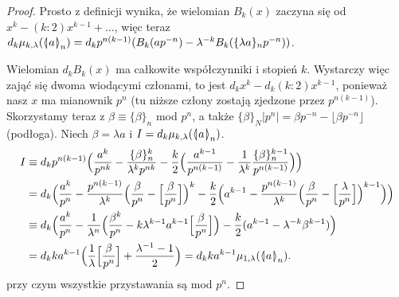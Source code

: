 \begin{proof}
	Prosto z definicji wynika, że wielomian $B_k(x)$ zaczyna się od $x^k - (k:2) x^{k-1} + \ldots$, więc teraz $d_k \mu_{k, \lambda} (\mathrel{\langle\mkern-3.85mu\mid\mkern-4mu} {a}\mathrel{\mkern-4mu\mid\mkern-3.85mu\rangle}_{n}) =  d_k p^{n(k-1)} (B_k(ap^{-n}) - \lambda^{-k} B_k(\{\lambda a\}_n p^{-n}))$.
	
	Wielomian $d_kB_k(x)$ ma całkowite współczynniki i stopień $k$.
	Wystarczy więc zająć się dwoma wiodącymi członami, to jest $d_k x^k - d_k (k:2) x^{k-1}$, ponieważ nasz $x$ ma mianownik $p^n$ (tu niższe człony zostają zjedzone przez $p^{n(k-1)}$).
	Skorzystamy teraz z $\beta \equiv \{\beta\}_n$ mod $p^n$, a także $\{\beta\}_N |p^n| = \beta p^{-n} - \lfloor \beta p^{-n} \rfloor$ (podłoga).
	Niech $\beta = \lambda a$ i $I = d_k\mu_{k,\lambda}(\mathrel{\langle\mkern-3.85mu\mid\mkern-4mu} {a}\mathrel{\mkern-4mu\mid\mkern-3.85mu\rangle}_{n})$. %
	\begin{align*}
	I & \equiv d_k p^{n(k-1)} \Bigl(\frac{a^k}{p^{nk}} - \frac{\{\beta\}_n^k}{\lambda^kp^{nk}} - \frac k 2 \Bigl(\frac{a^{k-1}}{p^{n(k-1)}} - \frac{1}{\lambda^k} \frac{\{\beta\}_n^{k-1}}{p^{n(k-1)}}\Bigr)\Bigr) \\
	& = d_k \Bigl(
			\frac{a^k}{p^n} - \frac{p^{n(k-1)}}{\lambda^k} \Bigl(
				\frac{\beta}{p^n} - \Bigl[
					\frac{\beta}{p^n}
				\Bigr]
			\Bigr)^k-\frac{k}{2} \Bigl(
				a^{k-1} - \frac{p^{n(k-1)}}{\lambda^k} \Bigl(
					\frac{\beta}{p^{n}} - \Bigl[
						\frac{\lambda}{p^n}
					\Bigr]
				\Bigr)^{k-1}
			\Bigr)
		\Bigr) \\
	& \equiv d_k \Bigl(\frac{a^k}{p^n} - \frac{1}{\lambda^n} \Bigl(\frac{\beta^k}{p^n} - k \lambda^{k-1} a^{k-1} \Bigl[\frac{\beta}{p^n}\Bigr]\Bigr)-\frac k2(a^{k-1}-\lambda^{-k}\beta^{k-1})\Bigr) \\
	& = d_k ka^{k-1}\Bigl(
		\frac 1\lambda \Bigl[
			\frac{\beta}{p^n}
		\Bigr] + \frac{\lambda^{-1}-1}{2}\Bigr) = d_k k a^{k-1} \mu_{1,\lambda}(\mathrel{\langle\mkern-3.85mu\mid\mkern-4mu} {a}\mathrel{\mkern-4mu\mid\mkern-3.85mu\rangle}_{n}).
	\end{align*}
	przy czym wszystkie przystawania są mod $p^n$.
\end{proof}

